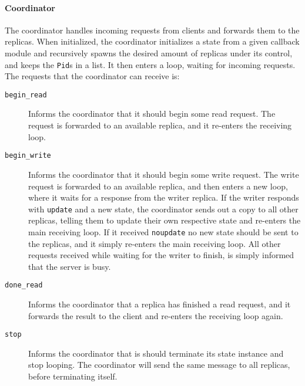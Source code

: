 \documentclass[a4paper]{article}
\begin{document}
\paragraph{Coordinator}
\label{par:coordinator}
The coordinator handles incoming requests from clients and forwards them to the replicas. When initialized, the coordinator initializes a state from a given callback module and recursively spawns the desired amount of replicas under its control, and keeps the \texttt{Pid}s in a list. It then enters a loop, waiting for incoming requests. The requests that the coordinator can receive is:
\begin{description}
  \item[\texttt{begin\_read} ] Informs the coordinator that it should begin some read request. The request is forwarded to an available replica, and it re-enters the receiving loop.
  \item[\texttt{begin\_write} ] Informs the coordinator that it should begin some write request. The write request is forwarded to an available replica, and then enters a new loop, where it waits for a response from the writer replica. If the writer responds with  \texttt{update} and a new state, the coordinator sends out a copy to all other replicas, telling them to update their own respective state and re-enters the main receiving loop. If it received \texttt{noupdate} no new state should be
    sent to the replicas, and it simply re-enters the main receiving loop. All other requests received while waiting for the writer to finish, is simply informed that the server is busy.
  \item[\texttt{done\_read} ] Informs the coordinator that a replica has finished a read request, and it forwards the result to the client and re-enters the receiving loop again.
  \item[\texttt{stop}] Informs the coordinator that is should terminate its state instance and stop looping. The coordinator will send the same message to all replicas, before terminating itself.
\end{description}
\end{document}
